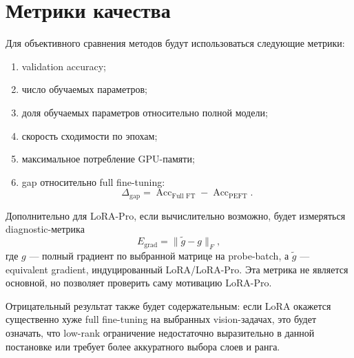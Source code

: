 \documentclass[]{scrartcl}
\begin{document}
\section{Метрики качества}

Для объективного сравнения методов будут использоваться следующие метрики:
\begin{enumerate}
    \item validation accuracy;
    \item число обучаемых параметров;
    \item доля обучаемых параметров относительно полной модели;
    \item скорость сходимости по эпохам;
    \item максимальное потребление GPU-памяти;
    \item gap относительно full fine-tuning:
    \[
        \Delta_{\text{gap}}
        =
        \operatorname{Acc}_{\text{Full FT}}
        -
        \operatorname{Acc}_{\text{PEFT}}.
    \]
\end{enumerate}

Дополнительно для LoRA-Pro, если вычислительно возможно, будет измеряться diagnostic-метрика
\[
    E_{\mathrm{grad}}
    =
    \|\widetilde{g} - g\|_F,
\]
где $g$ --- полный градиент по выбранной матрице на probe-batch, а $\widetilde{g}$ --- equivalent gradient, индуцированный LoRA/LoRA-Pro. Эта метрика не является основной, но позволяет проверить саму мотивацию LoRA-Pro.

Отрицательный результат также будет содержательным: если LoRA окажется существенно хуже full
fine-tuning на выбранных vision-задачах, это будет означать, что low-rank ограничение недостаточно
выразительно в данной постановке или требует более аккуратного выбора слоев и ранга.



\renewcommand{\refname}{Список литературы}


\end{document}
